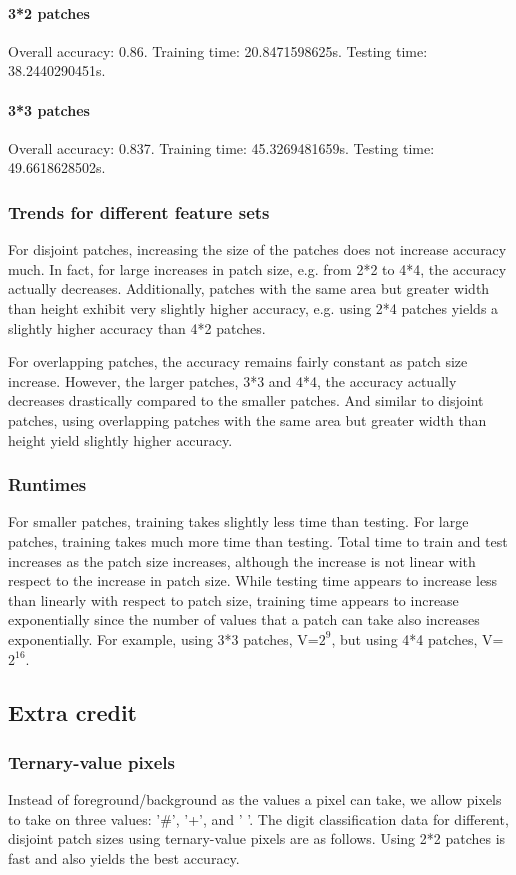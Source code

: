 \paragraph{3*2 patches}
Overall accuracy: 0.86. Training time: 20.8471598625s. Testing time: 38.2440290451s.
\paragraph{3*3 patches}
Overall accuracy: 0.837. Training time: 45.3269481659s. Testing time: 49.6618628502s.

\subsubsection{Trends for different feature sets}
For disjoint patches, increasing the size of the patches does not increase accuracy much. In fact, for large increases in patch size, e.g. from 2*2 to 4*4, the accuracy actually decreases. Additionally, patches with the same area but greater width than height exhibit very slightly higher accuracy, e.g. using 2*4 patches yields a slightly higher accuracy than 4*2 patches.

For overlapping patches, the accuracy remains fairly constant as patch size increase. However, the larger patches, 3*3 and 4*4, the accuracy actually decreases drastically compared to the smaller patches. And similar to disjoint patches, using overlapping patches with the same area but greater width than height yield slightly higher accuracy.

\subsubsection{Runtimes}
For smaller patches, training takes slightly less time than testing. For large patches, training takes much more time than testing. Total time to train and test increases as the patch size increases, although the increase is not linear with respect to the increase in patch size. While testing time appears to increase less than linearly with respect to patch size, training time appears to increase exponentially since the number of values that a patch can take also increases exponentially. For example, using 3*3 patches, V=$2^9$, but using 4*4 patches, V=$2^16$.

\subsection{Extra credit}
\subsubsection{Ternary-value pixels}
Instead of foreground/background as the values a pixel can take, we allow pixels to take on three values: '\#', '+', and ' '. The digit classification data for different, disjoint patch sizes using ternary-value pixels are as follows. Using 2*2 patches is fast and also yields the best accuracy.
